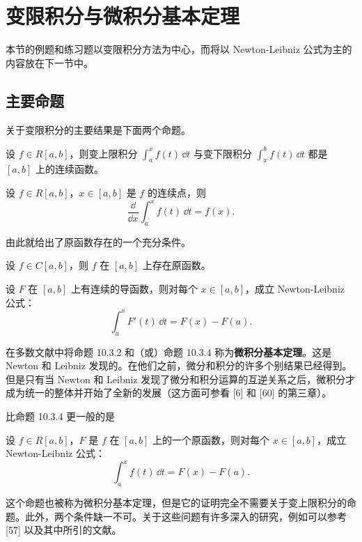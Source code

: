 \section{变限积分与微积分基本定理}

本节的例题和练习题以变限积分方法为中心，而将以 Newton-Leibniz 公式为主的内容放在下一节中。

\subsection{主要命题}

关于变限积分的主要结果是下面两个命题。

\begin{xtheorem}[10.3.1]
设 $f\in R[a,b]$，则变上限积分 $\int_a^x f(t)\,\dd t$ 与变下限积分 $\int_x^b f(t)\,\dd t$ 都是 $[a,b]$ 上的连续函数。
\end{xtheorem}

\begin{xtheorem}[10.3.2]
设 $f\in R[a,b]$，$x\in[a,b]$ 是 $f$ 的连续点，则
\[
  \frac{\dd}{\dd x}\int_a^x f(t)\,\dd t=f(x).
\]
\end{xtheorem}

由此就给出了原函数存在的一个充分条件。

\begin{xtheorem}[10.3.3（原函数存在定理）]
设 $f\in C[a,b]$，则 $f$ 在 $[a,b]$ 上存在原函数。
\end{xtheorem}

\begin{xtheorem}[10.3.4（微积分基本公式）]
设 $F$ 在 $[a,b]$ 上有连续的导函数，则对每个 $x\in[a,b]$，成立 Newton-Leibniz 公式：
\[
  \int_a^x F'(t)\,\dd t=F(x)-F(a).
\]
\end{xtheorem}

在多数文献中将命题 10.3.2 和（或）命题 10.3.4 称为\textbf{微积分基本定理}。这是 Newton 和 Leibniz 发现的。在他们之前，微分和积分的许多个别结果已经得到。但是只有当 Newton 和 Leibniz 发现了微分和积分运算的互逆关系之后，微积分才成为统一的整体并开始了全新的发展（这方面可参看 [6] 和 [60] 的第三章）。

比命题 10.3.4 更一般的是

\begin{xtheorem}[10.3.5]
设 $f\in R[a,b]$，$F$ 是 $f$ 在 $[a,b]$ 上的一个原函数，则对每个 $x\in[a,b]$，成立 Newton-Leibniz 公式：
\[
  \int_a^x f(t)\,\dd t=F(x)-F(a).
\]
\end{xtheorem}

\begin{xremark}
这个命题也被称为微积分基本定理，但是它的证明完全不需要关于变上限积分的命题。此外，两个条件缺一不可。关于这些问题有许多深入的研究，例如可以参考 [57] 以及其中所引的文献。
\end{xremark}

